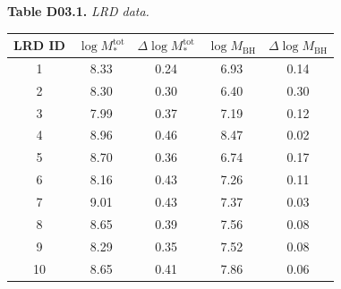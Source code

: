 \begin{center}
\textbf{Table D03.1.} \textit{LRD data.}

\medskip
\begin{tabular}{ccccc}
\toprule
LRD ID & $\log M_*^{\mathrm{tot}}$ & $\Delta\log M_*^{\mathrm{tot}}$
       & $\log M_{\mathrm{BH}}$ & $\Delta\log M_{\mathrm{BH}}$ \\
\midrule
1  & 8.33 & 0.24 & 6.93 & 0.14 \\
2  & 8.30 & 0.30 & 6.40 & 0.30 \\
3  & 7.99 & 0.37 & 7.19 & 0.12 \\
4  & 8.96 & 0.46 & 8.47 & 0.02 \\
5  & 8.70 & 0.36 & 6.74 & 0.17 \\
6  & 8.16 & 0.43 & 7.26 & 0.11 \\
7  & 9.01 & 0.43 & 7.37 & 0.03 \\
8  & 8.65 & 0.39 & 7.56 & 0.08 \\
9  & 8.29 & 0.35 & 7.52 & 0.08 \\
10 & 8.65 & 0.41 & 7.86 & 0.06 \\
\bottomrule
\end{tabular}
\end{center}

